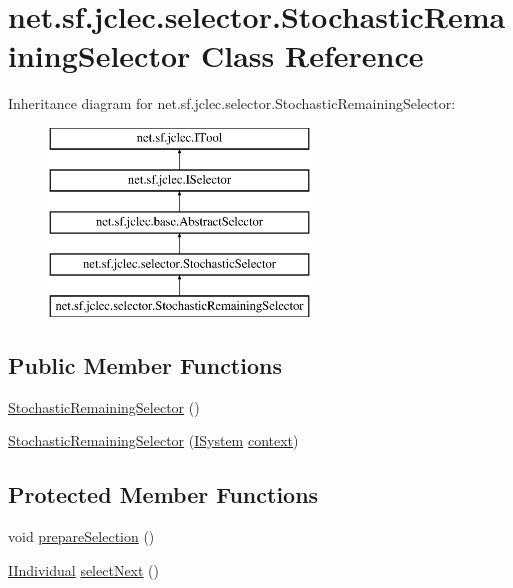 \hypertarget{classnet_1_1sf_1_1jclec_1_1selector_1_1_stochastic_remaining_selector}{\section{net.\-sf.\-jclec.\-selector.\-Stochastic\-Remaining\-Selector Class Reference}
\label{classnet_1_1sf_1_1jclec_1_1selector_1_1_stochastic_remaining_selector}
}
Inheritance diagram for net.\-sf.\-jclec.\-selector.\-Stochastic\-Remaining\-Selector\-:\begin{figure}[H]
\begin{center}
\leavevmode
\includegraphics[height=5.000000cm]{classnet_1_1sf_1_1jclec_1_1selector_1_1_stochastic_remaining_selector}
\end{center}
\end{figure}
\subsection*{Public Member Functions}
\begin{DoxyCompactItemize}
\item 
\hyperlink{classnet_1_1sf_1_1jclec_1_1selector_1_1_stochastic_remaining_selector_aa438a1634d9857a3f32e84425cccfcff}{Stochastic\-Remaining\-Selector} ()
\item 
\hyperlink{classnet_1_1sf_1_1jclec_1_1selector_1_1_stochastic_remaining_selector_a4a17590410a445162a6e127b77de8aa3}{Stochastic\-Remaining\-Selector} (\hyperlink{interfacenet_1_1sf_1_1jclec_1_1_i_system}{I\-System} \hyperlink{classnet_1_1sf_1_1jclec_1_1base_1_1_abstract_selector_a4304fe5c27aa7631dc91678d22473b94}{context})
\end{DoxyCompactItemize}
\subsection*{Protected Member Functions}
\begin{DoxyCompactItemize}
\item 
void \hyperlink{classnet_1_1sf_1_1jclec_1_1selector_1_1_stochastic_remaining_selector_aafb59c95f8c8324bfe7ca47311879773}{prepare\-Selection} ()
\item 
\hyperlink{interfacenet_1_1sf_1_1jclec_1_1_i_individual}{I\-Individual} \hyperlink{classnet_1_1sf_1_1jclec_1_1selector_1_1_stochastic_remaining_selector_aa334f3ed9889328cc51632ccf178123b}{select\-Next} ()
\end{DoxyCompactItemize}
